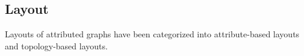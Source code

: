 









\subsection{Layout}
Layouts of attributed graphs have been categorized into attribute-based layouts and 
topology-based layouts.
